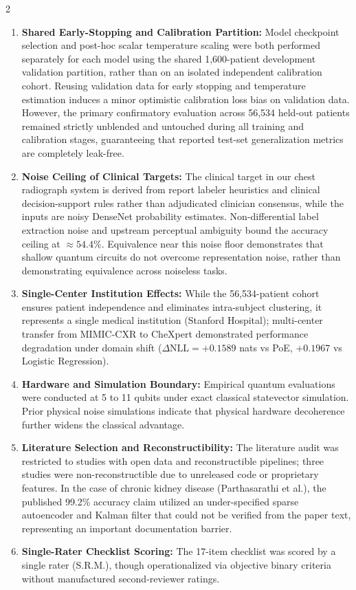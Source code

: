 \documentclass[10pt,a4paper,twoside]{article}
\begin{document}
\begin{multicols}{2}
\begin{enumerate}
  \item \textbf{Shared Early-Stopping and Calibration Partition:} Model checkpoint selection and post-hoc scalar temperature scaling were both performed separately for each model using the shared 1,600-patient development validation partition, rather than on an isolated independent calibration cohort. Reusing validation data for early stopping and temperature estimation induces a minor optimistic calibration loss bias on validation data. However, the primary confirmatory evaluation across 56,534 held-out patients remained strictly unblended and untouched during all training and calibration stages, guaranteeing that reported test-set generalization metrics are completely leak-free.
  \item \textbf{Noise Ceiling of Clinical Targets:} The clinical target in our chest radiograph system is derived from report labeler heuristics and clinical decision-support rules rather than adjudicated clinician consensus, while the inputs are noisy DenseNet probability estimates. Non-differential label extraction noise and upstream perceptual ambiguity bound the accuracy ceiling at $\approx 54.4\%$. Equivalence near this noise floor demonstrates that shallow quantum circuits do not overcome representation noise, rather than demonstrating equivalence across noiseless tasks.
  \item \textbf{Single-Center Institution Effects:} While the 56,534-patient cohort ensures patient independence and eliminates intra-subject clustering, it represents a single medical institution (Stanford Hospital); multi-center transfer from MIMIC-CXR to CheXpert demonstrated performance degradation under domain shift ($\Delta\text{NLL} = +0.1589$ nats vs PoE, $+0.1967$ vs Logistic Regression).
  \item \textbf{Hardware and Simulation Boundary:} Empirical quantum evaluations were conducted at 5 to 11 qubits under exact classical statevector simulation. Prior physical noise simulations indicate that physical hardware decoherence further widens the classical advantage.
  \item \textbf{Literature Selection and Reconstructibility:} The literature audit was restricted to studies with open data and reconstructible pipelines; three studies were non-reconstructible due to unreleased code or proprietary features. In the case of chronic kidney disease (Parthasarathi et al.), the published 99.2\% accuracy claim utilized an under-specified sparse autoencoder and Kalman filter that could not be verified from the paper text, representing an important documentation barrier.
  \item \textbf{Single-Rater Checklist Scoring:} The 17-item checklist was scored by a single rater (S.R.M.), though operationalized via objective binary criteria without manufactured second-reviewer ratings.
\end{enumerate}


\end{multicols}
\end{document}
